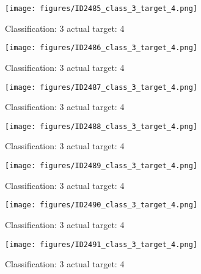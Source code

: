 \begin{figure}[h!]
\begin{center}
\texttt{[image: figures/ID2485\_class\_3\_target\_4.png]}
\end{center}
\caption{ Classification: 3 actual target: 4}
\label{fig:ID2485_class_3_target_4}
\end{figure}
\begin{figure}[h!]
\begin{center}
\texttt{[image: figures/ID2486\_class\_3\_target\_4.png]}
\end{center}
\caption{ Classification: 3 actual target: 4}
\label{fig:ID2486_class_3_target_4}
\end{figure}
\begin{figure}[h!]
\begin{center}
\texttt{[image: figures/ID2487\_class\_3\_target\_4.png]}
\end{center}
\caption{ Classification: 3 actual target: 4}
\label{fig:ID2487_class_3_target_4}
\end{figure}
\begin{figure}[h!]
\begin{center}
\texttt{[image: figures/ID2488\_class\_3\_target\_4.png]}
\end{center}
\caption{ Classification: 3 actual target: 4}
\label{fig:ID2488_class_3_target_4}
\end{figure}
\begin{figure}[h!]
\begin{center}
\texttt{[image: figures/ID2489\_class\_3\_target\_4.png]}
\end{center}
\caption{ Classification: 3 actual target: 4}
\label{fig:ID2489_class_3_target_4}
\end{figure}
\begin{figure}[h!]
\begin{center}
\texttt{[image: figures/ID2490\_class\_3\_target\_4.png]}
\end{center}
\caption{ Classification: 3 actual target: 4}
\label{fig:ID2490_class_3_target_4}
\end{figure}
\begin{figure}[h!]
\begin{center}
\texttt{[image: figures/ID2491\_class\_3\_target\_4.png]}
\end{center}
\caption{ Classification: 3 actual target: 4}
\label{fig:ID2491_class_3_target_4}
\end{figure}
